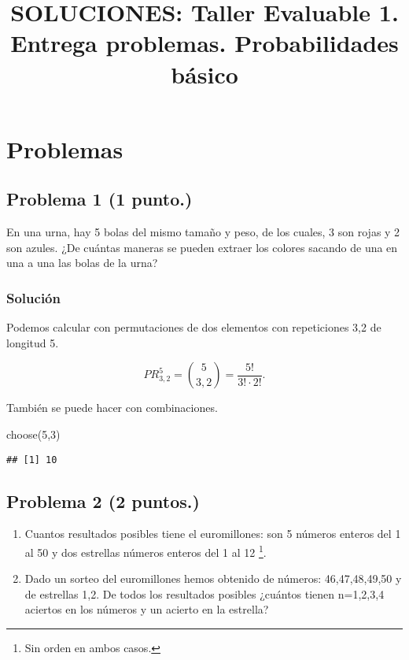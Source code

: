 \documentclass[
]{article}
\title{SOLUCIONES: Taller Evaluable 1. Entrega problemas. Probabilidades
básico}
\author{}
\date{\vspace{-2.5em}}
\newenvironment{Shaded}{\begin{snugshade}}{\end{snugshade}}
\newcommand{\DecValTok}[1]{\textcolor[rgb]{0.00,0.00,0.81}{#1}}
\newcommand{\FunctionTok}[1]{\textcolor[rgb]{0.00,0.00,0.00}{#1}}
\newcommand{\NormalTok}[1]{#1}
\begin{document}
\maketitle

\hypertarget{problemas}{%
\section{Problemas}\label{problemas}}

\hypertarget{problema-1}{%
\subsection{\texorpdfstring{Problema 1
(\textbf{1 punto.})}{Problema 1 ()}}\label{problema-1}}

En una urna, hay 5 bolas del mismo tamaño y peso, de los cuales, 3 son
rojas y 2 son azules. ¿De cuántas maneras se pueden extraer los colores
sacando de una en una a una las bolas de la urna?

\hypertarget{soluciuxf3n}{%
\subsubsection{Solución}\label{soluciuxf3n}}

Podemos calcular con permutaciones de dos elementos con repeticiones 3,2
de longitud 5.

\[
PR_{3,2}^5=\binom{5}{3 , 2}=\frac{5!}{3!\cdot 2!}.
\]

También se puede hacer con combinaciones.

\begin{Shaded}
\begin{Highlighting}[]
\FunctionTok{choose}\NormalTok{(}\DecValTok{5}\NormalTok{,}\DecValTok{3}\NormalTok{)}
\end{Highlighting}
\end{Shaded}

\begin{verbatim}
## [1] 10
\end{verbatim}

\hypertarget{problema-2}{%
\subsection{\texorpdfstring{Problema 2
(\textbf{2 puntos.})}{Problema 2 ()}}\label{problema-2}}

\begin{enumerate}
\def\labelenumi{\alph{enumi}.}
\item
  Cuantos resultados posibles tiene el euromillones: son 5 números
  enteros del 1 al 50 y dos estrellas números enteros del 1 al 12
  \footnote{Sin orden en ambos casos.}.
\item
  Dado un sorteo del euromillones hemos obtenido de números:
  46,47,48,49,50 y de estrellas 1,2. De todos los resultados posibles
  ¿cuántos tienen n=1,2,3,4 aciertos en los números y un acierto en la
  estrella?
\end{enumerate}
\end{document}
